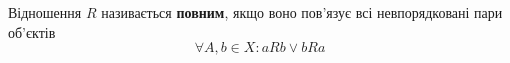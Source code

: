 \begin{large}
    \begin{theorem}
        Відношення $R$ називається \textbf{повним},
        якщо воно пов'язує всі невпорядковані пари об'єктів
        \begin{equation}
            \label{eq:relp_complete}
            \forall A, b \in X:
            a R b
            \vee
            b R a
        \end{equation}
    \end{theorem}
\end{large}
